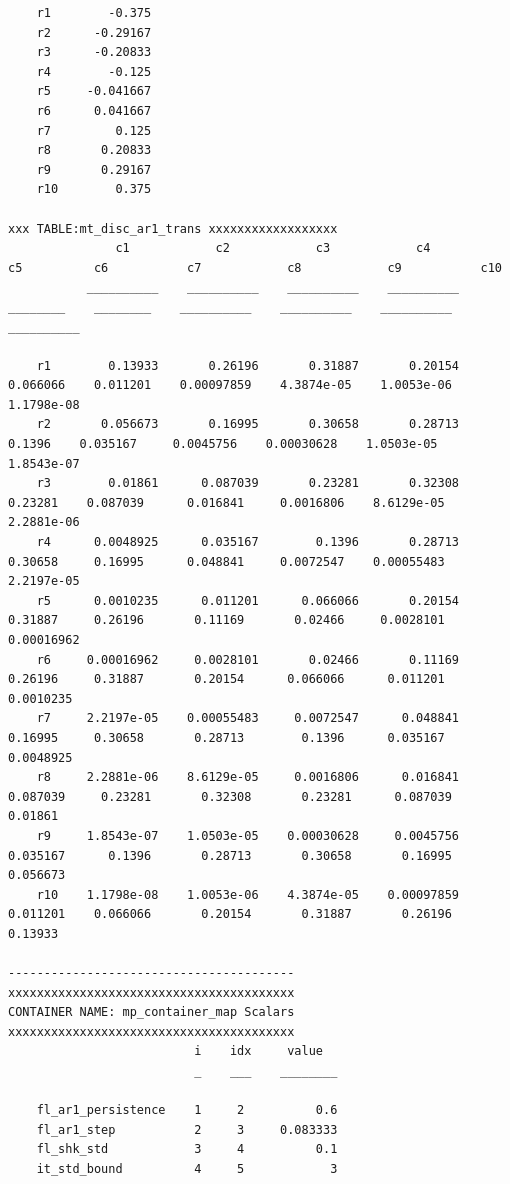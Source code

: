 \documentclass[
]{book}
\begin{document}
\begin{verbatim}
    r1        -0.375
    r2      -0.29167
    r3      -0.20833
    r4        -0.125
    r5     -0.041667
    r6      0.041667
    r7         0.125
    r8       0.20833
    r9       0.29167
    r10        0.375

xxx TABLE:mt_disc_ar1_trans xxxxxxxxxxxxxxxxxx
               c1            c2            c3            c4           c5          c6           c7            c8            c9           c10    
           __________    __________    __________    __________    ________    ________    __________    __________    __________    __________

    r1        0.13933       0.26196       0.31887       0.20154    0.066066    0.011201    0.00097859    4.3874e-05    1.0053e-06    1.1798e-08
    r2       0.056673       0.16995       0.30658       0.28713      0.1396    0.035167     0.0045756    0.00030628    1.0503e-05    1.8543e-07
    r3        0.01861      0.087039       0.23281       0.32308     0.23281    0.087039      0.016841     0.0016806    8.6129e-05    2.2881e-06
    r4      0.0048925      0.035167        0.1396       0.28713     0.30658     0.16995      0.048841     0.0072547    0.00055483    2.2197e-05
    r5      0.0010235      0.011201      0.066066       0.20154     0.31887     0.26196       0.11169       0.02466     0.0028101    0.00016962
    r6     0.00016962     0.0028101       0.02466       0.11169     0.26196     0.31887       0.20154      0.066066      0.011201     0.0010235
    r7     2.2197e-05    0.00055483     0.0072547      0.048841     0.16995     0.30658       0.28713        0.1396      0.035167     0.0048925
    r8     2.2881e-06    8.6129e-05     0.0016806      0.016841    0.087039     0.23281       0.32308       0.23281      0.087039       0.01861
    r9     1.8543e-07    1.0503e-05    0.00030628     0.0045756    0.035167      0.1396       0.28713       0.30658       0.16995      0.056673
    r10    1.1798e-08    1.0053e-06    4.3874e-05    0.00097859    0.011201    0.066066       0.20154       0.31887       0.26196       0.13933

----------------------------------------
xxxxxxxxxxxxxxxxxxxxxxxxxxxxxxxxxxxxxxxx
CONTAINER NAME: mp_container_map Scalars
xxxxxxxxxxxxxxxxxxxxxxxxxxxxxxxxxxxxxxxx
                          i    idx     value  
                          _    ___    ________

    fl_ar1_persistence    1     2          0.6
    fl_ar1_step           2     3     0.083333
    fl_shk_std            3     4          0.1
    it_std_bound          4     5            3


\end{verbatim}
\end{document}
